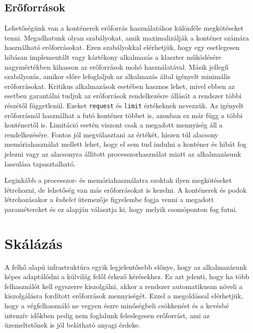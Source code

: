 \subsection{Erőforrások}
Lehetőségünk van a konténerek erőforrás használatához különféle megkötéseket tenni. 
Megadhatunk olyan szabályokat, amik maximalizálják a konténer számára használható erőforrásokat.
Ezen szabályokkal elérhetjük, hogy egy esetlegesen hibásan implementált vagy kártékony alkalmazás a klaszter működésére nagymértékben kihasson az erőforrások mohó használatával.
Másik jellegű szabályozás, amikor előre lefoglaljuk az alkalmazás által igényelt minimális erőforrásokat.
Kritikus alkalmazások esetében hasznos lehet, mivel ebben az esetben garantálni tudjuk az erőforrások rendelkezésre állását a rendszer többi részétől függetlenül.
Ezeket \verb+request+  és \verb+limit+ értékeknek nevezzük.
Az igényelt erőforrásnál használhat a futó konténer többet is, azonban ez már függ a többi konténertől is.
Limitáció esetén viszont csak a megadott mennyiség áll a rendelkezésére.
Fontos jól megválasztani az értékét, hiszen túl alacsony memóriahasználat mellett lehet, hogy el sem tud indulni a konténer és hibát fog jelezni vagy az alacsonyra állított processzorhasználat miatt az alkalmazásunk lassulása tapasztalható.

Leginkább a processzor- és memóriahasználatra szoktak ilyen megkötéseket létrehozni, de lehetőség van más erőforrásokat is kezelni.
A konténerek és podok létrehozásakor a \textit{kubelet} ütemezője figyelembe fogja venni a megadott paramétereket és ez alapján választja ki, hogy melyik csomóponton fog futni.

\section{Skálázás}
A felhő alapú infrastruktúra egyik legjelentősebb előnye, hogy az alkalmazásunk képes adaptálódni a külvilág felől érkező kérésekhez. Ez azt jelenti, hogy ha több felhasználót kell egyszerre kiszolgálni, akkor a rendszer automatikusan növeli a kiszolgálásra fordított erőforrások mennyiségét. Ezzel a megoldással elérhetjük, hogy a végfelhasználó ne vegyen észre minőségbeli csökkenést és a kevésbé intenzív időkben pedig nem foglalunk feleslegesen erőforrást, ami az üzemeltetőnek is jól belátható anyagi érdeke.
 

